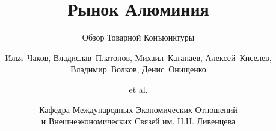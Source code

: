 \title[Экономическая Конъюнктура] %
{Рынок Алюминия}

\subtitle{Обзор Товарной Конъюнктуры}

\author[4-МЭО-5] %
    {Илья~Чаков, 
    Владислав~Платонов,
    Михаил~Катанаев,
    Алексей~Киселев,
    Владимир~Волков,
    Денис~Онищенко \and et al.
    }


\date[Ноябрь 2024] %
{Кафедра Международных Экономических Отношений \\
и Внешнеэкономических Связей им. Н.Н. Ливенцева}